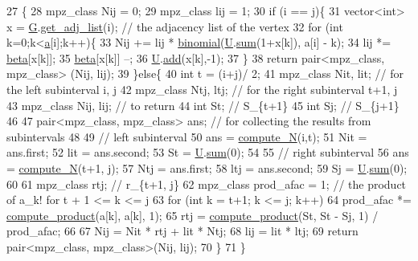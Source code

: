 \begin{DoxyCode}
27   \{
28     mpz\_class Nij = 0;
29     mpz\_class lij = 1;
30     \textcolor{keywordflow}{if} (i == j)\{
31       vector<int> x = \hyperlink{classb__graph__encoder_af969e24f445db0e54513086604e2c165}{G}.\hyperlink{classb__graph_aa81c7179b9c6cb4986c4b41e84a85799}{get\_adj\_list}(i); \textcolor{comment}{// the adjacency list of the vertex}
32       \textcolor{keywordflow}{for} (\textcolor{keywordtype}{int} k=0;k<\hyperlink{classb__graph__encoder_afd22d167f495cd85b41397f337c377c2}{a}[i];k++)\{
33         Nij += lij * \hyperlink{compression__helper_8cpp_a4bc36d358aecc67feee9f87efc041d32}{binomial}(\hyperlink{classb__graph__encoder_ac810138443002a2b2cf579ced2dc34ce}{U}.\hyperlink{classreverse__fenwick__tree_a672731fd6395b4853430073a099a80e6}{sum}(1+x[k]), a[i] - k);
34         lij *= \hyperlink{classb__graph__encoder_ae54d76cc4cee399d98951f870897a144}{beta}[x[k]];
35         \hyperlink{classb__graph__encoder_ae54d76cc4cee399d98951f870897a144}{beta}[x[k]] --;
36         \hyperlink{classb__graph__encoder_ac810138443002a2b2cf579ced2dc34ce}{U}.\hyperlink{classreverse__fenwick__tree_a942d7f49b37e53ebfec3076d177691d7}{add}(x[k],-1);
37       \}
38       \textcolor{keywordflow}{return} pair<mpz\_class, mpz\_class> (Nij, lij);
39     \}\textcolor{keywordflow}{else}\{
40       \textcolor{keywordtype}{int} t = (i+j)/ 2;
41       mpz\_class Nit, lit; \textcolor{comment}{// for the left subinterval i, j}
42       mpz\_class Ntj, ltj; \textcolor{comment}{// for the right subinterval t+1, j}
43       mpz\_class Nij, lij; \textcolor{comment}{// to return}
44       \textcolor{keywordtype}{int} St; \textcolor{comment}{// S\_\{t+1\}}
45       \textcolor{keywordtype}{int} Sj; \textcolor{comment}{// S\_\{j+1\}}
46 
47       pair<mpz\_class, mpz\_class> ans; \textcolor{comment}{// for collecting the results from subintervals}
48 
49       \textcolor{comment}{// left subinterval}
50       ans = \hyperlink{classb__graph__encoder_a58e4aae68aab6cd8e4d34fc6b658c380}{compute\_N}(i,t);
51       Nit = ans.first;
52       lit = ans.second;
53       St = \hyperlink{classb__graph__encoder_ac810138443002a2b2cf579ced2dc34ce}{U}.\hyperlink{classreverse__fenwick__tree_a672731fd6395b4853430073a099a80e6}{sum}(0);
54 
55       \textcolor{comment}{// right subinterval}
56       ans = \hyperlink{classb__graph__encoder_a58e4aae68aab6cd8e4d34fc6b658c380}{compute\_N}(t+1, j);
57       Ntj = ans.first;
58       ltj = ans.second;
59       Sj = \hyperlink{classb__graph__encoder_ac810138443002a2b2cf579ced2dc34ce}{U}.\hyperlink{classreverse__fenwick__tree_a672731fd6395b4853430073a099a80e6}{sum}(0);
60 
61       mpz\_class rtj; \textcolor{comment}{// r\_\{t+1, j\}}
62       mpz\_class prod\_afac = 1; \textcolor{comment}{// the product of a\_k! for t + 1 <= k <= j}
63       \textcolor{keywordflow}{for} (\textcolor{keywordtype}{int} k = t+1; k <= j; k++)
64         prod\_afac *= \hyperlink{compression__helper_8cpp_ac683dff9ff89796df0ab62cd65c30990}{compute\_product}(a[k], a[k], 1);
65       rtj = \hyperlink{compression__helper_8cpp_ac683dff9ff89796df0ab62cd65c30990}{compute\_product}(St, St - Sj, 1) / prod\_afac; 
66 
67       Nij = Nit * rtj + lit * Ntj;
68       lij = lit * ltj;
69       \textcolor{keywordflow}{return} pair<mpz\_class, mpz\_class>(Nij, lij);
70     \}
71   \}
\end{DoxyCode}

